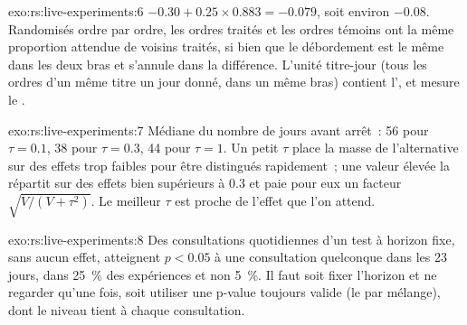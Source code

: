 \begin{solution}{exo:rs:live-experiments:6}
$-0.30 + 0.25 \times 0.883 = -0.079$, soit environ $-0.08$. Randomisés ordre par ordre, les ordres traités et les ordres témoins ont la même proportion attendue de
voisins traités, si bien que le débordement est le même dans les deux bras et s'annule dans la différence. L'unité titre-jour (tous les ordres d'un même titre un jour donné, dans un même bras) contient
l', et mesure le .
\end{solution}

\begin{solution}{exo:rs:live-experiments:7}
Médiane du nombre de jours avant arrêt~: 56 pour $\tau = 0.1$, 38 pour $\tau = 0.3$, 44 pour $\tau = 1$. Un petit $\tau$ place la masse de l'alternative sur des effets trop faibles pour
être distingués rapidement~; une valeur élevée la répartit sur des effets bien supérieurs à 0.3 et paie pour eux un facteur $\sqrt{V/(V+\tau^2)}$. Le meilleur $\tau$ est proche de
l'effet que l'on attend.
\end{solution}

\begin{solution}{exo:rs:live-experiments:8}
Des consultations quotidiennes d'un test à horizon fixe, sans aucun effet, atteignent $p < 0.05$ à une consultation quelconque dans les 23 jours, dans 25~\% des expériences et non 5~\%. Il faut soit fixer
l'horizon et ne regarder qu'une fois, soit utiliser une p-value toujours valide (le  par mélange), dont le niveau tient à chaque consultation.
\end{solution}

